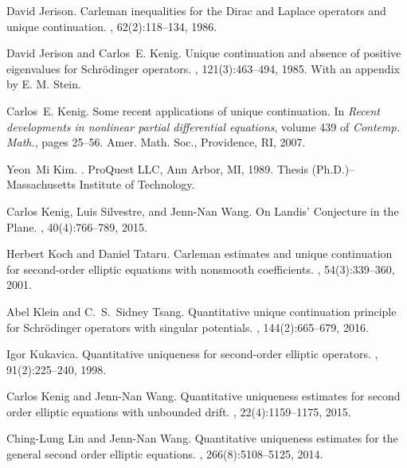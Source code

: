 \documentclass[11pt]{amsart}
\theoremstyle{plain}
\numberwithin{equation}{section}
\begin{document}
\begin{thebibliography}{BKRS88}
David Jerison.
\newblock Carleman inequalities for the {D}irac and {L}aplace operators and
  unique continuation.
, 62(2):118--134, 1986.

David Jerison and Carlos~E. Kenig.
\newblock Unique continuation and absence of positive eigenvalues for
  {S}chr\"odinger operators.
, 121(3):463--494, 1985.
\newblock With an appendix by E. M. Stein.

Carlos~E. Kenig.
\newblock Some recent applications of unique continuation.
\newblock In {\em Recent developments in nonlinear partial differential
  equations}, volume 439 of {\em Contemp. Math.}, pages 25--56. Amer. Math.
  Soc., Providence, RI, 2007.

Yeon~Mi Kim.
.
\newblock ProQuest LLC, Ann Arbor, MI, 1989.
\newblock Thesis (Ph.D.)--Massachusetts Institute of Technology.

Carlos Kenig, Luis Silvestre, and Jenn-Nan Wang.
\newblock On {L}andis' {C}onjecture in the {P}lane.
, 40(4):766--789, 2015.

Herbert Koch and Daniel Tataru.
\newblock Carleman estimates and unique continuation for second-order elliptic
  equations with nonsmooth coefficients.
, 54(3):339--360, 2001.

Abel Klein and C.~S.~Sidney Tsang.
\newblock Quantitative unique continuation principle for {S}chr{\"o}dinger
  operators with singular potentials.
, 144(2):665--679, 2016.

Igor Kukavica.
\newblock Quantitative uniqueness for second-order elliptic operators.
, 91(2):225--240, 1998.

Carlos Kenig and Jenn-Nan Wang.
\newblock Quantitative uniqueness estimates for second order elliptic equations
  with unbounded drift.
, 22(4):1159--1175, 2015.

Ching-Lung Lin and Jenn-Nan Wang.
\newblock Quantitative uniqueness estimates for the general second order
  elliptic equations.
, 266(8):5108--5125, 2014.


\end{thebibliography}
\end{document}
